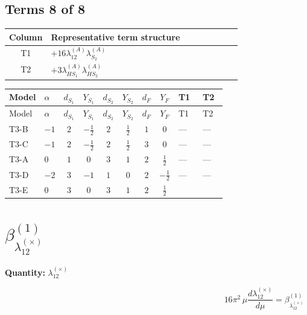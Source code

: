 \documentclass[8pt]{article}
\begin{document}
\begin{landscape}
\subsection*{Terms 8 of 8}
\begin{center}
\begin{tabular}{@{}c >{\raggedright\arraybackslash}p{0.82\linewidth}@{}}
\toprule
Column & Representative term structure \\
\midrule
T1 & \(\displaystyle +16 {\lambda_{12}^{(A)}} {\lambda_{S_2}^{(A)}}\) \\
\midrule
T2 & \(\displaystyle +3 {\lambda_{HS_1}^{(A)}} {\lambda_{HS_2}^{(A)}}\) \\
\midrule
\bottomrule
\end{tabular}
\end{center}
\smallskip
\tiny
\begin{longtable}{@{}llcccccc >{\raggedright\arraybackslash}p{0.21\linewidth} >{\raggedright\arraybackslash}p{0.21\linewidth}@{}}
\toprule
Model & $\alpha$ & $d_{S_1}$ & $Y_{S_1}$ & $d_{S_2}$ & $Y_{S_2}$ & $d_F$ & $Y_F$ & T1 & T2 \\
\midrule
\endfirsthead
\toprule
Model & $\alpha$ & $d_{S_1}$ & $Y_{S_1}$ & $d_{S_2}$ & $Y_{S_2}$ & $d_F$ & $Y_F$ & T1 & T2 \\
\midrule
\endhead
T3-B & $-1$ & $2$ & $-\frac{1}{2}$ & $2$ & $\frac{1}{2}$ & $1$ & $0$ & --- & --- \\
\midrule
T3-C & $-1$ & $2$ & $-\frac{1}{2}$ & $2$ & $\frac{1}{2}$ & $3$ & $0$ & --- & --- \\
\midrule
T3-A & $0$ & $1$ & $0$ & $3$ & $1$ & $2$ & $\frac{1}{2}$ & --- & --- \\
\midrule
T3-D & $-2$ & $3$ & $-1$ & $1$ & $0$ & $2$ & $-\frac{1}{2}$ & --- & --- \\
\midrule
T3-E & $0$ & $3$ & $0$ & $3$ & $1$ & $2$ & $\frac{1}{2}$ & \scriptsize\adjustbox{max width=\linewidth}{$\begin{gathered} +16 {\lambda_{12}^{(A)}} {\lambda_{S_2}^{(A)}}\end{gathered}$} & \scriptsize\adjustbox{max width=\linewidth}{$\begin{gathered} +3 {\lambda_{HS_1}^{(A)}} {\lambda_{HS_2}^{(A)}}\end{gathered}$} \\
\midrule
\bottomrule
\end{longtable}
\clearpage
\section*{$\beta_{\lambda_{12}^{(\times)}}^{(1)}$}
\noindent\textbf{Quantity: }$\lambda_{12}^{(\times)}$\par\smallskip
\[16\pi^2\,\mu\frac{d \lambda_{12}^{(\times)}}{d\mu}=\beta_{\lambda_{12}^{(\times)}}^{(1)}\]

\end{landscape}
\end{document}
